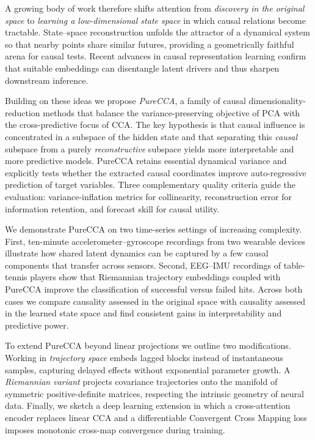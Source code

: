\documentclass[14pt]{extarticle}
\begin{document}
	A growing body of work therefore shifts attention from \emph{discovery in the original space} to \emph{learning a low-dimensional state space} in which causal relations become tractable.  
	State–space reconstruction unfolds the attractor of a dynamical system so that nearby points share similar futures, providing a geometrically faithful arena for causal tests.  
	Recent advances in causal representation learning \citep{Scholkopf2021} confirm that suitable embeddings can disentangle latent drivers and thus sharpen downstream inference.  
	
	Building on these ideas we propose \emph{PureCCA}, a family of causal dimensionality-reduction methods that balance the variance-preserving objective of PCA with the cross-predictive focus of CCA.  
	The key hypothesis is that causal influence is concentrated in a subspace of the hidden state and that separating this \emph{causal} subspace from a purely \emph{reconstructive} subspace yields more interpretable and more predictive models.  
	PureCCA retains essential dynamical variance and explicitly tests whether the extracted causal coordinates improve auto-regressive prediction of target variables.  
	Three complementary quality criteria guide the evaluation: variance-inflation metrics for collinearity, reconstruction error for information retention, and forecast skill for causal utility.  
	
	We demonstrate PureCCA on two time-series settings of increasing complexity.  
	First, ten-minute accelerometer–gyroscope recordings from two wearable devices illustrate how shared latent dynamics can be captured by a few causal components that transfer across sensors.  
	Second, EEG–IMU recordings of table-tennis players show that Riemannian trajectory embeddings coupled with PureCCA improve the classification of successful versus failed hits.  
	Across both cases we compare causality assessed in the original space with causality assessed in the learned state space and find consistent gains in interpretability and predictive power.  
	
	To extend PureCCA beyond linear projections we outline two modifications.  
	Working in \emph{trajectory space} embeds lagged blocks instead of instantaneous samples, capturing delayed effects without exponential parameter growth.  
	A \emph{Riemannian variant} projects covariance trajectories onto the manifold of symmetric positive-definite matrices, respecting the intrinsic geometry of neural data.  
	Finally, we sketch a deep learning extension in which a cross-attention encoder replaces linear CCA and a differentiable Convergent Cross Mapping loss imposes monotonic cross-map convergence during training.  
	
\end{document}
